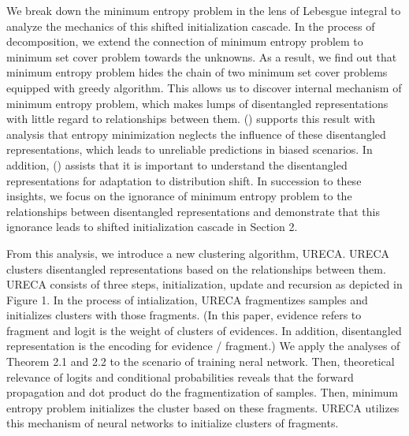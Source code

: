 We break down the minimum entropy problem in the lens of Lebesgue integral 
to analyze the mechanics of this shifted initialization cascade.
In the process of decomposition, we extend the connection of minimum entropy problem 
to minimum set cover problem towards the unknowns. 
As a result, we find out that minimum entropy problem hides the chain of two minimum set cover problems equipped with greedy algorithm.
This allows us to discover internal mechanism of minimum entropy problem, 
which makes lumps of disentangled representations with little regard to relationships between them.
(\cite{LeeJLPSHY24}) supports this result with analysis 
that entropy minimization neglects the influence of these disentangled representations, 
which leads to unreliable predictions in biased scenarios. 
In addition, (\cite{WilesGSRKDC22}) assists that it is important to understand the disentangled representations for adaptation to distribution shift.
In succession to these insights, 
we focus on the ignorance of minimum entropy problem to the relationships between disentangled representations
and demonstrate that this ignorance leads to shifted initialization cascade in Section 2. 

From this analysis,  we introduce a new clustering algorithm, URECA.
URECA clusters disentangled representations based on the relationships between them. 
URECA consists of three steps, initialization, update and recursion as depicted in Figure 1.
In the process of intialization, URECA fragmentizes samples and initializes clusters with those fragments.
(In this paper, evidence refers to fragment and logit is the weight of clusters of evidences. 
In addition, disentangled representation is the encoding for evidence / fragment.)
We apply the analyses of Theorem 2.1 and 2.2 to the scenario of training neral network.
Then, theoretical relevance of logits and conditional probabilities reveals that the forward propagation and dot product do 
the fragmentization of samples.
Then, minimum entropy problem initializes the cluster based on these fragments.
URECA utilizes this mechanism of neural networks to initialize clusters of fragments. 

